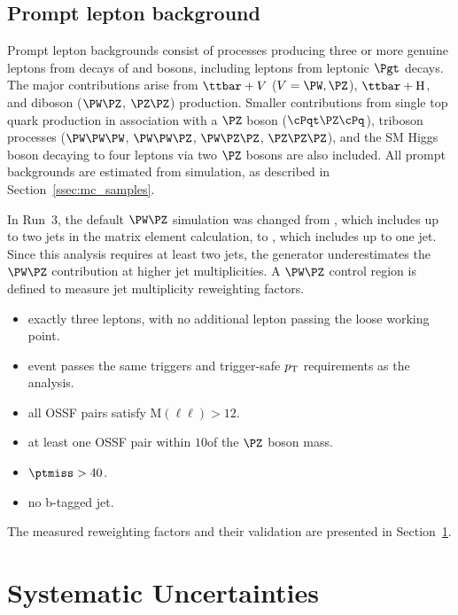 \subsection{Prompt lepton background}
\label{ssec:prompt_bkg}

Prompt lepton backgrounds consist of processes producing three or more genuine leptons from decays of \PW and \PZ bosons, including leptons from leptonic $\Pgt$ decays. The major contributions arise from $\ttbar+V$ ($V = \PW, \PZ$), $\ttbar+\PH$, and diboson ($\PW\PZ$, $\PZ\PZ$) production. Smaller contributions from single top quark production in association with a $\PZ$ boson ($\cPqt\PZ\cPq$), triboson processes ($\PW\PW\PW$, $\PW\PW\PZ$, $\PW\PZ\PZ$, $\PZ\PZ\PZ$), and the SM Higgs boson decaying to four leptons via two $\PZ$ bosons are also included. All prompt backgrounds are estimated from simulation, as described in Section~\ref{ssec:mc_samples}.

In Run~3, the default $\PW\PZ$ simulation was changed from \MGvATNLO, which includes up to two jets in the matrix element calculation, to \POWHEG, which includes up to one jet. Since this analysis requires at least two jets, the \POWHEG generator underestimates the $\PW\PZ$ contribution at higher jet multiplicities. A $\PW\PZ$ control region is defined to measure jet multiplicity reweighting factors.
\begin{itemize}
  \item exactly three leptons, with no additional lepton passing the loose working point.
  \item event passes the same triggers and trigger-safe $p_{\mathrm{T}}$ requirements as the analysis.
  \item all OSSF pairs satisfy $\mathrm{M}(\ell\ell) > 12$\GeV.
  \item at least one OSSF pair within $10$\GeV of the $\PZ$ boson mass.
  \item $\ptmiss > 40$\GeV.
  \item no b-tagged jet.
\end{itemize}
The measured reweighting factors and their validation are presented in Section~\ref{sec:systematics}.

\section{Systematic Uncertainties}
\label{sec:systematics}

